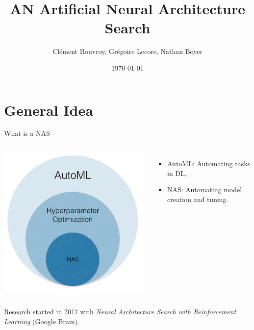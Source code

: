 \documentclass{beamer}
\date{\today}
\author{Clément Rouvroy, Grégoire Lecore, Nathan Boyer}
\institute{Deep Learning Course - M1}
\title{\textcolor{mBlue}{AN} \textcolor{mBlue}{A}rtificial \textcolor{mBlue}{N}eural \textcolor{mBlue}{A}rchitecture \textcolor{mBlue}{S}earch}
\begin{document}
  \maketitle

\section{General Idea}
\begin{frame}{What is a NAS}
    \begin{columns}
        \centering
        \includegraphics[width=0.9\linewidth]{nas-inclusion.jpg}
        
        \centering
        \begin{itemize}
            \item[ ]\textcolor{mBlue}{AutoML}: Automating tasks in DL,
            \item[ ] \textcolor{mBlue}{NAS}: Automating model creation and tuning.
        \end{itemize}
        
    \end{columns}

Research started in 2017 with \emph{Neural Architecture Search with Reinforcement Learning} (Google Brain).
\end{frame}
\end{document}

